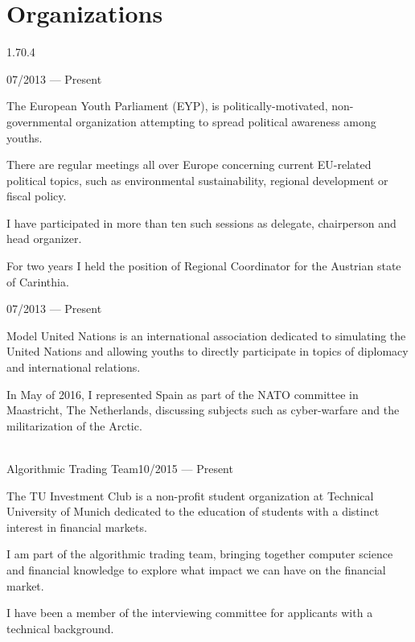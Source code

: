 \vspace{-0.25cm}
\section{Organizations}{1.7}{0.4}
\begin{entry}{}{}{07/2013 --- Present}
  \item The European Youth Parliament (EYP), is politically-motivated, non-governmental organization attempting to spread political awareness among youths.
  \item There are regular meetings all over Europe concerning current EU-related political topics, such as environmental sustainability, regional development or fiscal policy.
  \item I have participated in more than ten such sessions as delegate, chairperson and head organizer.
  \item For two years I held the position of Regional Coordinator for the Austrian state of Carinthia.
\end{entry}
\begin{entry}{}{}{07/2013 --- Present}
  \item Model United Nations is an international association dedicated to simulating the United Nations and allowing youths to directly participate in topics of diplomacy and international relations.
  \item In May of 2016, I represented Spain as part of the NATO committee in Maastricht, The Netherlands, discussing subjects such as cyber-warfare and the militarization of the Arctic.
\end{entry}
\begin{entry}{}{\\Algorithmic Trading Team}{10/2015 --- Present}
  \item The TU Investment Club is a non-profit student organization at Technical University of Munich dedicated to the education of students with a distinct interest in financial markets.
  \item I am part of the algorithmic trading team, bringing together computer science and financial knowledge to explore what impact we can have on the financial market.
  \item I have been a member of the interviewing committee for applicants with a technical background.
\end{entry}
